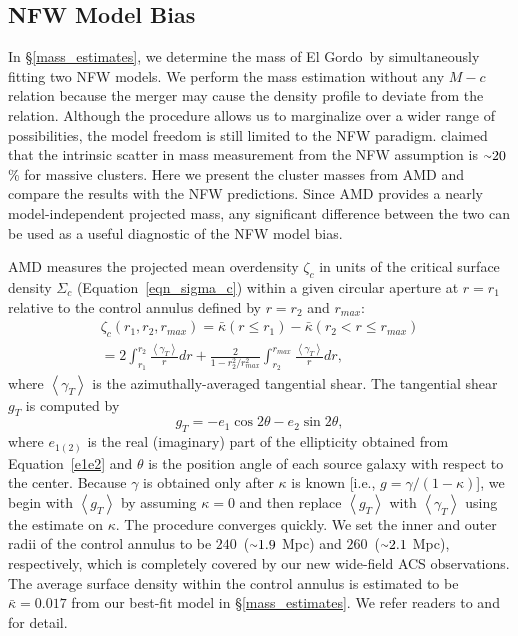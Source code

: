 \documentclass[twocolumn]{aastex631}
\newcommand{\elgordo}{El Gordo}
\newcommand{\mytilde}{\raise.19ex\hbox{$\scriptstyle\sim$}}
\begin{document}
\subsection{NFW Model Bias} \label{systematics}
In \S\ref{mass_estimates}, we determine the mass of \elgordo~by simultaneously fitting two NFW models. 
We perform the mass estimation without any $M-c$ relation because the merger may cause the density profile to deviate from the relation. Although the procedure allows us to marginalize over a wider range of possibilities, the model freedom is still limited to the NFW paradigm. \cite{Becker2011} claimed that the intrinsic scatter in mass measurement from the NFW assumption is $\mytilde20$\% for massive clusters. 
Here we present the cluster masses from AMD and compare the results with the NFW predictions. Since AMD provides a nearly model-independent projected mass, any significant difference between the two can be used as a useful diagnostic of the NFW model bias. 


AMD measures the projected mean overdensity $\zeta_c$ in units of the critical surface density $\Sigma_{c}$ (Equation~\ref{eqn_sigma_c}) within a given circular aperture at $r=r_1$ relative to the control annulus defined by $r=r_2$ and $r_{max}$:
\begin{eqnarray}
\zeta_c (r_1, r_2,r_{max}) =  \bar{\kappa}( r \leq r_1) -
\bar{\kappa}( r_2 < r \leq r_{max}) \nonumber \\ = 2 \int_{r_1}^{r_2} \frac{
 \left < \gamma_T \right > }{r}dr  + \frac{2}{1-r_2^2/r_{max}^2}
\int_{r_2}^{r_{max}} \frac{ \left <\gamma_T \right >}{r} dr, \label{eqn_AMD}
\end{eqnarray}
\noindent
where $\left < \gamma_T \right>$ is the azimuthally-averaged tangential shear. 
The tangential shear $g_T$ is computed by
\begin{equation}
g_T = -e_1 \cos 2\theta - e_2 \sin 2\theta \label{tan_shear},
\end{equation}
\noindent
where $e_{1(2)}$ is the real (imaginary) part of the ellipticity obtained from Equation~\ref{e1e2} and $\theta$ is the position angle of each source galaxy with respect to the center. 
Because $\gamma$ is obtained only after $\kappa$ is known [i.e., $g=\gamma/(1-\kappa)$], we begin with $\left < g_T \right >$ by assuming $\kappa=0$ and then replace $\left < g_T \right >$ with $\left < \gamma_T \right>$ using the estimate on $\kappa$.
The procedure converges quickly.
We set the inner and outer radii of the control annulus to be $240$\arcsec~($\mytilde1.9$ Mpc) and $260$\arcsec~($\mytilde2.1$ Mpc), respectively, which is completely covered by our new wide-field ACS observations. 
The average surface density within the control annulus is estimated to be $\bar{\kappa}=0.017$ from our best-fit model in \S\ref{mass_estimates}.
We refer readers to \cite{Clowe2000} and \cite{Jee2005} for detail.
\end{document}
